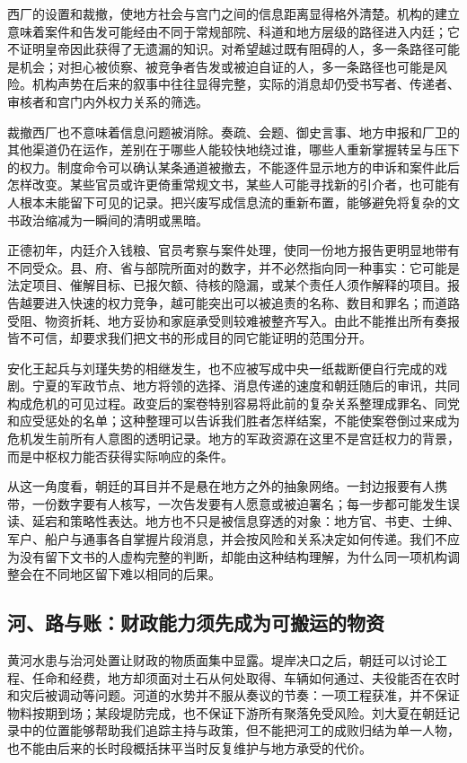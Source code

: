 西厂的设置和裁撤，使地方社会与宫门之间的信息距离显得格外清楚。机构的建立意味着案件和告发可能经由不同于常规部院、科道和地方层级的路径进入内廷；它不证明皇帝因此获得了无遗漏的知识。对希望越过既有阻碍的人，多一条路径可能是机会；对担心被侦察、被竞争者告发或被迫自证的人，多一条路径也可能是风险。机构声势在后来的叙事中往往显得完整，实际的消息却仍受书写者、传递者、审核者和宫门内外权力关系的筛选。

裁撤西厂也不意味着信息问题被消除。奏疏、会题、御史言事、地方申报和厂卫的其他渠道仍在运作，差别在于哪些人能较快地绕过谁，哪些人重新掌握转呈与压下的权力。制度命令可以确认某条通道被撤去，不能逐件显示地方的申诉和案件此后怎样改变。某些官员或许更倚重常规文书，某些人可能寻找新的引介者，也可能有人根本未能留下可见的记录。把兴废写成信息流的重新布置，能够避免将复杂的文书政治缩减为一瞬间的清明或黑暗。

正德初年，内廷介入钱粮、官员考察与案件处理，使同一份地方报告更明显地带有不同受众。县、府、省与部院所面对的数字，并不必然指向同一种事实：它可能是法定项目、催解目标、已报欠额、待核的隐漏，或某个责任人须作解释的项目。报告越要进入快速的权力竞争，越可能突出可以被追责的名称、数目和罪名；而道路受阻、物资折耗、地方妥协和家庭承受则较难被整齐写入。由此不能推出所有奏报皆不可信，却要求我们把文书的形成目的同它能证明的范围分开。

安化王起兵与刘瑾失势的相继发生，也不应被写成中央一纸裁断便自行完成的戏剧。宁夏的军政节点、地方将领的选择、消息传递的速度和朝廷随后的审讯，共同构成危机的可见过程。政变后的案卷特别容易将此前的复杂关系整理成罪名、同党和应受惩处的名单；这种整理可以告诉我们胜者怎样结案，不能使案卷倒过来成为危机发生前所有人意图的透明记录。地方的军政资源在这里不是宫廷权力的背景，而是中枢权力能否获得实际响应的条件。

从这一角度看，朝廷的耳目并不是悬在地方之外的抽象网络。一封边报要有人携带，一份数字要有人核写，一次告发要有人愿意或被迫署名；每一步都可能发生误读、延宕和策略性表达。地方也不只是被信息穿透的对象：地方官、书吏、士绅、军户、船户与通事各自掌握片段消息，并会按风险和关系决定如何传递。我们不应为没有留下文书的人虚构完整的判断，却能由这种结构理解，为什么同一项机构调整会在不同地区留下难以相同的后果。

\subsection{河、路与账：财政能力须先成为可搬运的物资}

黄河水患与治河处置让财政的物质面集中显露。堤岸决口之后，朝廷可以讨论工程、任命和经费，地方却须面对土石从何处取得、车辆如何通过、夫役能否在农时和灾后被调动等问题。河道的水势并不服从奏议的节奏：一项工程获准，并不保证物料按期到场；某段堤防完成，也不保证下游所有聚落免受风险。刘大夏在朝廷记录中的位置能够帮助我们追踪主持与政策，但不能把河工的成败归结为单一人物，也不能由后来的长时段概括抹平当时反复维护与地方承受的代价。

